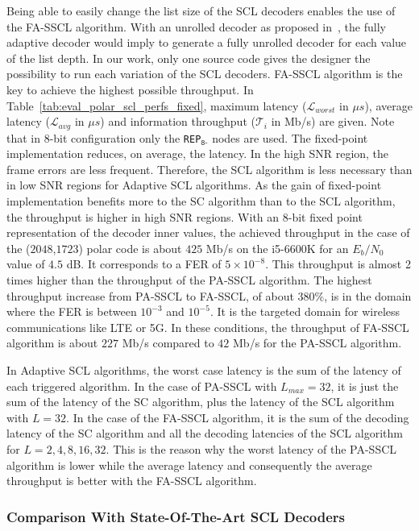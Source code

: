 Being able to easily change the list size of the SCL decoders enables the use of
the FA-SSCL algorithm. With an unrolled decoder as proposed
in~\cite{Sarkis2016}, the fully adaptive decoder would imply to generate a fully
unrolled decoder for each value of the list depth. In our work, only one source
code gives the designer the possibility to run each variation of the SCL
decoders. FA-SSCL algorithm is the key to achieve the highest possible
throughput. In Table~\ref{tab:eval_polar_scl_perfs_fixed}, maximum latency
($\mathcal{L}_{worst}$ in $\mu s$), average latency ($\mathcal{L}_{avg}$ in
$\mu s$) and information throughput ($\mathcal{T}_i$ in Mb/s) are given. Note
that in 8-bit configuration only the \texttt{REP}$_{\texttt{8-}}$ nodes are
used. The fixed-point implementation reduces, on average, the latency. In the
high SNR region, the frame errors are less frequent. Therefore, the SCL
algorithm is less necessary than in low SNR regions for Adaptive SCL algorithms.
As the gain of fixed-point implementation benefits more to the SC algorithm than
to the SCL algorithm, the throughput is higher in high SNR regions. With an
8-bit fixed point representation of the decoder inner values, the achieved
throughput in the case of the ($2048$,$1723$) polar code is about $425$ Mb/s on
the i5-6600K for an $E_b/N_0$ value of $4.5$ dB. It corresponds to a FER of
$5\times10^{-8}$. This throughput is almost 2 times higher than the throughput
of the PA-SSCL algorithm. The highest throughput increase from PA-SSCL to
FA-SSCL, of about $380\%$, is in the domain where the FER is between $10^{-3}$
and $10^{-5}$. It is the targeted domain for wireless communications like LTE or
5G. In these conditions, the throughput of FA-SSCL algorithm is about $227$ Mb/s
compared to $42$ Mb/s for the PA-SSCL algorithm.

In Adaptive SCL algorithms, the worst case latency is the sum of the latency of
each triggered algorithm. In the case of PA-SSCL with $L_{max}=32$, it is just
the sum of the latency of the SC algorithm, plus the latency of the SCL
algorithm with $L=32$. In the case of the FA-SSCL algorithm, it is the sum of
the decoding latency of the SC algorithm and all the decoding latencies of the
SCL algorithm for $L={2,4,8,16,32}$. This is the reason why the worst latency of
the PA-SSCL algorithm is lower while the average latency and consequently the
average throughput is better with the FA-SSCL algorithm.

\subsubsection{Comparison With State-Of-The-Art SCL Decoders}

